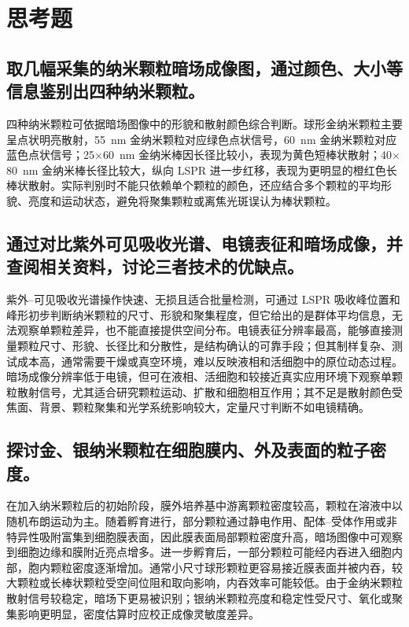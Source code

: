 \documentclass[a4paper]{article}
\begin{document}
\section{思考题}
\vspace{-0.5em}

\subsection{取几幅采集的纳米颗粒暗场成像图，通过颜色、大小等信息鉴别出四种纳米颗粒。}

四种纳米颗粒可依据暗场图像中的形貌和散射颜色综合判断。球形金纳米颗粒主要呈点状明亮散射，55~nm 金纳米颗粒对应绿色点状信号，60~nm 金纳米颗粒对应蓝色点状信号；25$\times$60~nm 金纳米棒因长径比较小，表现为黄色短棒状散射；40$\times$80~nm 金纳米棒长径比较大，纵向 LSPR 进一步红移，表现为更明显的橙红色长棒状散射。实际判别时不能只依赖单个颗粒的颜色，还应结合多个颗粒的平均形貌、亮度和运动状态，避免将聚集颗粒或离焦光斑误认为棒状颗粒。

\subsection{通过对比紫外可见吸收光谱、电镜表征和暗场成像，并查阅相关资料，讨论三者技术的优缺点。}

紫外--可见吸收光谱操作快速、无损且适合批量检测，可通过 LSPR 吸收峰位置和峰形初步判断纳米颗粒的尺寸、形貌和聚集程度，但它给出的是群体平均信息，无法观察单颗粒差异，也不能直接提供空间分布。电镜表征分辨率最高，能够直接测量颗粒尺寸、形貌、长径比和分散性，是结构确认的可靠手段；但其制样复杂、测试成本高，通常需要干燥或真空环境，难以反映液相和活细胞中的原位动态过程。暗场成像分辨率低于电镜，但可在液相、活细胞和较接近真实应用环境下观察单颗粒散射信号，尤其适合研究颗粒运动、扩散和细胞相互作用；其不足是散射颜色受焦面、背景、颗粒聚集和光学系统影响较大，定量尺寸判断不如电镜精确。

\subsection{探讨金、银纳米颗粒在细胞膜内、外及表面的粒子密度。}

在加入纳米颗粒后的初始阶段，膜外培养基中游离颗粒密度较高，颗粒在溶液中以随机布朗运动为主。随着孵育进行，部分颗粒通过静电作用、配体--受体作用或非特异性吸附富集到细胞膜表面，因此膜表面局部颗粒密度升高，暗场图像中可观察到细胞边缘和膜附近亮点增多。进一步孵育后，一部分颗粒可能经内吞进入细胞内部，胞内颗粒密度逐渐增加。通常小尺寸球形颗粒更容易接近膜表面并被内吞，较大颗粒或长棒状颗粒受空间位阻和取向影响，内吞效率可能较低。由于金纳米颗粒散射信号较稳定，暗场下更易被识别；银纳米颗粒亮度和稳定性受尺寸、氧化或聚集影响更明显，密度估算时应校正成像灵敏度差异。
\end{document}
